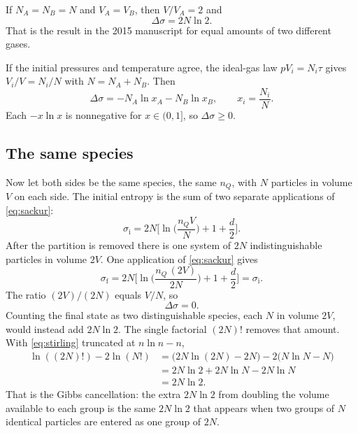 If \(N_A = N_B = N\) and \(V_A = V_B\), then \(V/V_A = 2\) and
\begin{equation}
\label{eq:equal-halves}
\Delta\sigma = 2N\ln 2.
\end{equation}
That is the result in the 2015 manuscript for equal amounts of two different gases.

If the initial pressures and temperature agree, the ideal-gas law \(pV_i = N_i\tau\) gives \(V_i/V = N_i/N\) with \(N = N_A + N_B\). Then
\begin{equation}
\label{eq:mixing-mole-fraction}
\Delta\sigma = - N_A\ln x_A - N_B\ln x_B,
\qquad
x_i = \frac{N_i}{N}.
\end{equation}
Each \(-x\ln x\) is nonnegative for \(x\in(0,1]\), so \(\Delta\sigma\ge 0\).

\subsection{The same species}

Now let both sides be the same species, the same \(n_Q\), with \(N\) particles in volume \(V\) on each side. The initial entropy is the sum of two separate applications of \eqref{eq:sackur}:
\begin{equation}
\label{eq:identical-initial}
\sigma_{\mathrm{i}}
= 2N\Biggl[\ln\biggl(\frac{n_Q V}{N}\biggr) + 1 + \frac{d}{2}\Biggr].
\end{equation}
After the partition is removed there is one system of \(2N\) indistinguishable particles in volume \(2V\). One application of \eqref{eq:sackur} gives
\begin{equation}
\label{eq:identical-final}
\sigma_{\mathrm{f}}
= 2N\Biggl[\ln\biggl(\frac{n_Q\,(2V)}{2N}\biggr) + 1 + \frac{d}{2}\Biggr]
= \sigma_{\mathrm{i}}.
\end{equation}
The ratio \((2V)/(2N)\) equals \(V/N\), so
\begin{equation}
\label{eq:identical-delta}
\Delta\sigma = 0.
\end{equation}
Counting the final state as two distinguishable species, each \(N\) in volume \(2V\), would instead add \(2N\ln 2\). The single factorial \((2N)!\) removes that amount. With \eqref{eq:stirling} truncated at \(n\ln n - n\),
\begin{align}
\ln((2N)!) - 2\ln(N!)
&= \bigl(2N\ln(2N) - 2N\bigr) - 2\bigl(N\ln N - N\bigr) \nonumber\\
&= 2N\ln 2 + 2N\ln N - 2N\ln N \nonumber\\
&= 2N\ln 2.
\label{eq:stirling-cancellation}
\end{align}
That is the Gibbs cancellation: the extra \(2N\ln 2\) from doubling the volume available to each group is the same \(2N\ln 2\) that appears when two groups of \(N\) identical particles are entered as one group of \(2N\).

